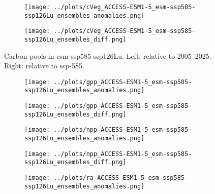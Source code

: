 \documentclass[]{article}
\begin{document}
\begin{figure}[H]
\begin{subfigure}[b]{0.4\linewidth}
        \texttt{[image: ../plots/cVeg\_ACCESS-ESM1-5\_esm-ssp585-ssp126Lu\_ensembles\_anomalies.png]}
    \end{subfigure}
    \begin{subfigure}[b]{0.4\linewidth}
        \texttt{[image: ../plots/cVeg\_ACCESS-ESM1-5\_esm-ssp585-ssp126Lu\_ensembles\_diff.png]}
    \end{subfigure}
    \caption{Carbon pools in esm-ssp585-ssp126Lu. Left: relative to 2005–2025. Right: relative to ssp-585.}
    \label{fig:cpools}
\end{figure}

\begin{figure}[H]
    \centering
    \begin{subfigure}[b]{0.4\linewidth}
        \texttt{[image: ../plots/gpp\_ACCESS-ESM1-5\_esm-ssp585-ssp126Lu\_ensembles\_anomalies.png]}
    \end{subfigure}
    \begin{subfigure}[b]{0.4\linewidth}
        \texttt{[image: ../plots/gpp\_ACCESS-ESM1-5\_esm-ssp585-ssp126Lu\_ensembles\_diff.png]}
    \end{subfigure}
    \begin{subfigure}[b]{0.4\linewidth}
        \texttt{[image: ../plots/npp\_ACCESS-ESM1-5\_esm-ssp585-ssp126Lu\_ensembles\_anomalies.png]}
    \end{subfigure}
    \begin{subfigure}[b]{0.4\linewidth}
        \texttt{[image: ../plots/npp\_ACCESS-ESM1-5\_esm-ssp585-ssp126Lu\_ensembles\_diff.png]}
    \end{subfigure}
    \begin{subfigure}[b]{0.4\linewidth}
        \texttt{[image: ../plots/ra\_ACCESS-ESM1-5\_esm-ssp585-ssp126Lu\_ensembles\_anomalies.png]}

\end{subfigure}
\end{figure}
\end{document}
